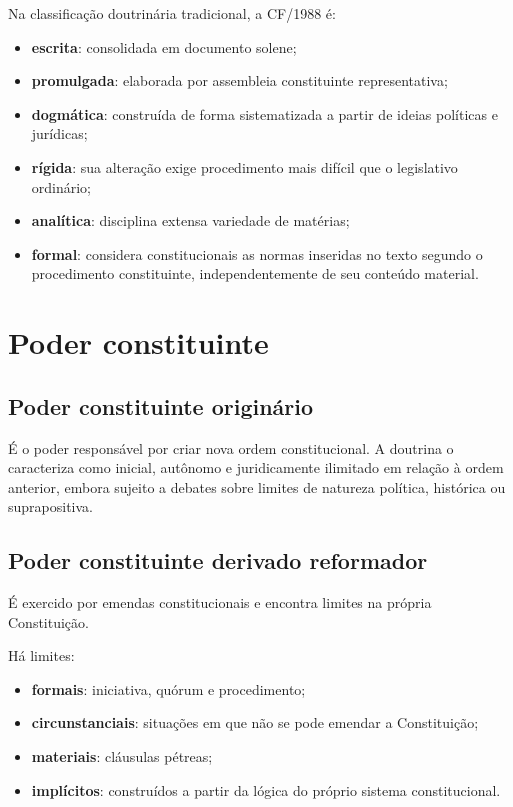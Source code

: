 Na classificação doutrinária tradicional, a CF/1988 é:
\begin{itemize}
\item \textbf{escrita}: consolidada em documento solene;
\item \textbf{promulgada}: elaborada por assembleia constituinte representativa;
\item \textbf{dogmática}: construída de forma sistematizada a partir de ideias políticas e jurídicas;
\item \textbf{rígida}: sua alteração exige procedimento mais difícil que o legislativo ordinário;
\item \textbf{analítica}: disciplina extensa variedade de matérias;
\item \textbf{formal}: considera constitucionais as normas inseridas no texto segundo o procedimento constituinte, independentemente de seu conteúdo material.
\end{itemize}

\section{Poder constituinte}

\subsection{Poder constituinte originário}

É o poder responsável por criar nova ordem constitucional. A doutrina o caracteriza como inicial, autônomo e juridicamente ilimitado em relação à ordem anterior, embora sujeito a debates sobre limites de natureza política, histórica ou suprapositiva.

\subsection{Poder constituinte derivado reformador}

É exercido por emendas constitucionais e encontra limites na própria Constituição.

Há limites:
\begin{itemize}
\item \textbf{formais}: iniciativa, quórum e procedimento;
\item \textbf{circunstanciais}: situações em que não se pode emendar a Constituição;
\item \textbf{materiais}: cláusulas pétreas;
\item \textbf{implícitos}: construídos a partir da lógica do próprio sistema constitucional.
\end{itemize}

